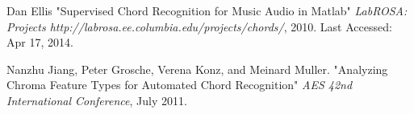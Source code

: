 \documentclass{article}
\begin{document}
\begin{thebibliography}{citations}
Dan Ellis
"Supervised Chord Recognition for Music Audio in Matlab"
{\it LabROSA: Projects http://labrosa.ee.columbia.edu/projects/chords/},
2010. Last Accessed: Apr 17, 2014.

Nanzhu Jiang, Peter Grosche, Verena Konz, and Meinard Muller.
"Analyzing Chroma Feature Types for Automated Chord Recognition"
{\it AES 42nd International Conference},
July 2011.

\end{thebibliography}


\end{document}
